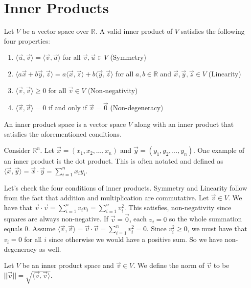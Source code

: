 \chapter{Inner Products}

\begin{definition}
    Let $V$ be a vector space over $\mathbb{R}$. A valid inner product of $V$ satisfies the following four properties:
\begin{enumerate}
    \item $\langle\vec{u},\vec{v}\rangle=\langle\vec{v},\vec{u}\rangle$ for all $\vec{v},\vec{u}\in V$ (Symmetry)
    \item $\langle a\vec{x}+b\vec{y},\vec{z}\rangle=a\langle\vec{x},\vec{z}\rangle+b\langle\vec{y},\vec{z}\rangle$ for all $a,b\in\mathbb{R}$ and $\vec{x},\vec{y},\vec{z}\in V$ (Linearity)
    \item $\langle\vec{v},\vec{v}\rangle\geq 0$ for all $\vec{v}\in V$ (Non-negativity)
    \item $\langle\vec{v},\vec{v}\rangle=0$ if and only if $\vec{v}=\vec{0}$ (Non-degeneracy)
\end{enumerate}
\end{definition}
\begin{definition}
    An inner product space is a vector space $V$ along with an inner product that satisfies the aforementioned conditions.
\end{definition}
\begin{example}
    Consider $\mathbb{R}^n$. Let $\vec{x}=(x_1, x_2,\ldots, x_n)$ and $\vec{y}=(y_1,y_2,\ldots,y_n)$. One example of an inner product is the dot product. This is often notated and defined as $\langle\vec{x},\vec{y}\rangle=\vec{x}\cdot\vec{y}=\sum_{i=1}^n x_iy_i$.

    Let's check the four conditions of inner products. Symmetry and Linearity follow from the fact that addition and multiplication are commutative. Let $\vec{v}\in V$. We have that $\vec{v}\cdot\vec{v}=\sum_{i=1}^n v_iv_i=\sum_{i=1}^n v_i^2$. This satisfies, non-negativity since squares are always non-negative. If $\vec{v}=\vec{0}$, each $v_i=0$ so the whole summation equals $0$. Assume $\langle\vec{v},\vec{v}\rangle=\vec{v}\cdot\vec{v}=\sum_{i=1}^n v_i^2=0$. Since $v_i^2\geq 0$, we must have that $v_i=0$ for all $i$ since otherwise we would have a positive sum. So we have non-degeneracy as well.
\end{example}
\begin{definition}
    Let $V$ be an inner product space and $\vec{v}\in V$. We define the norm of $\vec{v}$ to be $||\vec{v}||=\sqrt{\langle\vec{v},\vec{v}\rangle}$.
\end{definition}
